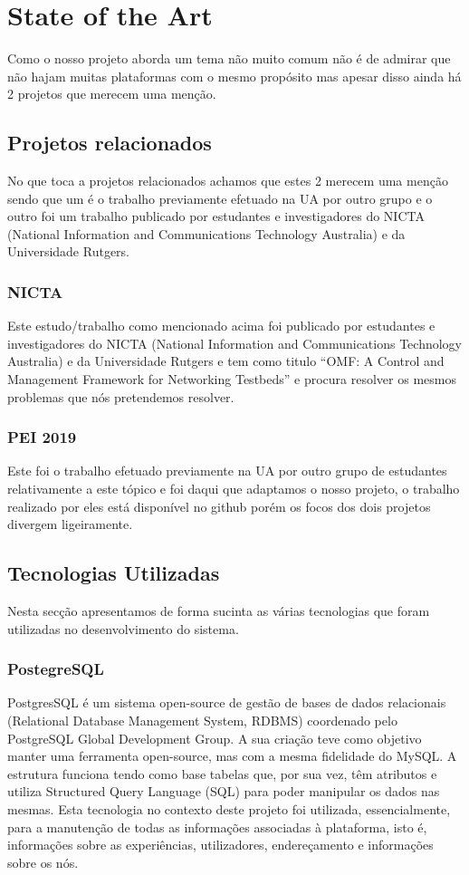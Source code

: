 \chapter{State of the Art}
Como o nosso projeto aborda um tema não muito comum não é de admirar que não hajam muitas plataformas com o mesmo propósito mas apesar disso ainda há 2 projetos que merecem uma menção.
\section{Projetos relacionados}
No que toca a projetos relacionados achamos que estes 2 merecem uma menção sendo que um é o trabalho previamente efetuado na UA por outro grupo e o outro foi um trabalho publicado por estudantes e investigadores do NICTA (National Information and Communications Technology Australia) e da Universidade Rutgers.
\subsection{NICTA}
Este estudo/trabalho como mencionado acima foi publicado por estudantes e investigadores do NICTA (National Information and Communications Technology Australia) e da Universidade Rutgers e tem como titulo “OMF: A Control and Management Framework for Networking Testbeds” e procura resolver os mesmos problemas que nós pretendemos resolver.
\subsection{PEI 2019}
Este foi o trabalho efetuado previamente na UA por outro grupo de estudantes relativamente a este tópico e foi daqui que adaptamos o nosso projeto, o trabalho realizado por eles está disponível no github porém os focos dos dois projetos divergem ligeiramente.
\section{Tecnologias Utilizadas}
Nesta secção apresentamos de forma sucinta as várias tecnologias que foram utilizadas no desenvolvimento do sistema.
\subsection{PostegreSQL}
PostgresSQL é um sistema open-source de gestão de bases de dados relacionais (Relational Database Management System, RDBMS) coordenado pelo PostgreSQL Global Development Group. A sua criação teve como objetivo manter uma ferramenta open-source, mas com a mesma fidelidade do MySQL.\newline
A estrutura funciona tendo como base tabelas que, por sua vez, têm atributos e utiliza Structured Query Language (SQL) para poder manipular os dados nas mesmas.
Esta tecnologia no contexto deste projeto foi utilizada, essencialmente, para a manutenção de todas as informações associadas à plataforma, isto é, informações sobre as experiências, utilizadores, endereçamento e informações sobre os nós.
